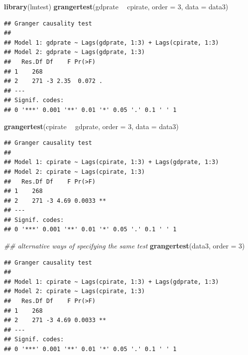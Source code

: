 \documentclass[]{book}
\newenvironment{Shaded}{\begin{snugshade}}{\end{snugshade}}
\newcommand{\CommentTok}[1]{\textcolor[rgb]{0.56,0.35,0.01}{\textit{#1}}}
\newcommand{\DataTypeTok}[1]{\textcolor[rgb]{0.13,0.29,0.53}{#1}}
\newcommand{\DecValTok}[1]{\textcolor[rgb]{0.00,0.00,0.81}{#1}}
\newcommand{\KeywordTok}[1]{\textcolor[rgb]{0.13,0.29,0.53}{\textbf{#1}}}
\newcommand{\NormalTok}[1]{#1}
\newcommand{\OperatorTok}[1]{\textcolor[rgb]{0.81,0.36,0.00}{\textbf{#1}}}
\newcommand{\StringTok}[1]{\textcolor[rgb]{0.31,0.60,0.02}{#1}}
\begin{document}
\begin{Shaded}
\begin{Highlighting}[]
\KeywordTok{library}\NormalTok{(lmtest)}
\KeywordTok{grangertest}\NormalTok{(gdprate }\OperatorTok{~}\StringTok{ }\NormalTok{cpirate, }\DataTypeTok{order =} \DecValTok{3}\NormalTok{, }\DataTypeTok{data =}\NormalTok{ data3)}
\end{Highlighting}
\end{Shaded}

\begin{verbatim}
## Granger causality test
## 
## Model 1: gdprate ~ Lags(gdprate, 1:3) + Lags(cpirate, 1:3)
## Model 2: gdprate ~ Lags(gdprate, 1:3)
##   Res.Df Df    F Pr(>F)  
## 1    268                 
## 2    271 -3 2.35  0.072 .
## ---
## Signif. codes:  
## 0 '***' 0.001 '**' 0.01 '*' 0.05 '.' 0.1 ' ' 1
\end{verbatim}

\begin{Shaded}
\begin{Highlighting}[]
\KeywordTok{grangertest}\NormalTok{(cpirate }\OperatorTok{~}\StringTok{ }\NormalTok{gdprate, }\DataTypeTok{order =} \DecValTok{3}\NormalTok{, }\DataTypeTok{data =}\NormalTok{ data3)}
\end{Highlighting}
\end{Shaded}

\begin{verbatim}
## Granger causality test
## 
## Model 1: cpirate ~ Lags(cpirate, 1:3) + Lags(gdprate, 1:3)
## Model 2: cpirate ~ Lags(cpirate, 1:3)
##   Res.Df Df    F Pr(>F)   
## 1    268                  
## 2    271 -3 4.69 0.0033 **
## ---
## Signif. codes:  
## 0 '***' 0.001 '**' 0.01 '*' 0.05 '.' 0.1 ' ' 1
\end{verbatim}

\begin{Shaded}
\begin{Highlighting}[]
\CommentTok{## alternative ways of specifying the same test}
\KeywordTok{grangertest}\NormalTok{(data3, }\DataTypeTok{order =} \DecValTok{3}\NormalTok{)}
\end{Highlighting}
\end{Shaded}

\begin{verbatim}
## Granger causality test
## 
## Model 1: cpirate ~ Lags(cpirate, 1:3) + Lags(gdprate, 1:3)
## Model 2: cpirate ~ Lags(cpirate, 1:3)
##   Res.Df Df    F Pr(>F)   
## 1    268                  
## 2    271 -3 4.69 0.0033 **
## ---
## Signif. codes:  
## 0 '***' 0.001 '**' 0.01 '*' 0.05 '.' 0.1 ' ' 1
\end{verbatim}
\end{document}
